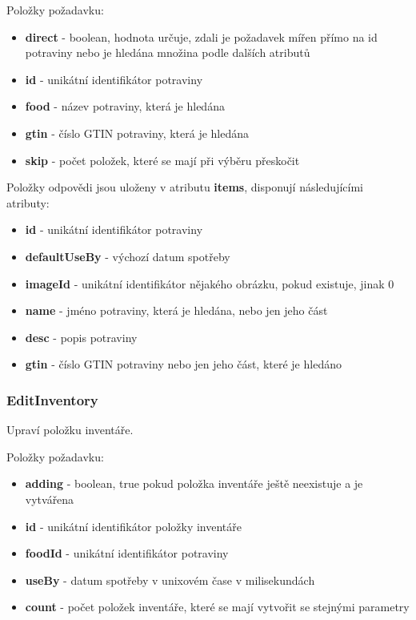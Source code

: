\documentclass[thesis=B,czech]{FITthesis}[2013/10/20]
\begin{document}
Položky požadavku:
\begin{itemize}
  \item \textbf{direct} - boolean, hodnota určuje, zdali je požadavek mířen přímo na id potraviny nebo je hledána množina podle dalších atributů
  \item \textbf{id} - unikátní identifikátor potraviny
  \item \textbf{food} - název potraviny, která je hledána
  \item \textbf{gtin} - číslo GTIN potraviny, která je hledána
  \item \textbf{skip} - počet položek, které se mají při výběru přeskočit
\end{itemize}

Položky odpovědi jsou uloženy v atributu \textbf{items}, disponují následujícími atributy:
\begin{itemize}
  \item \textbf{id} - unikátní identifikátor potraviny
  \item \textbf{defaultUseBy} - výchozí datum spotřeby
  \item \textbf{imageId} - unikátní identifikátor nějakého obrázku, pokud existuje, jinak 0
  \item \textbf{name} - jméno potraviny, která je hledána, nebo jen jeho část
  \item \textbf{desc} - popis potraviny
  \item \textbf{gtin} - číslo GTIN potraviny nebo jen jeho část, které je hledáno
\end{itemize}


\subsubsection{EditInventory}
Upraví položku inventáře.

Položky požadavku:
\begin{itemize}
  \item \textbf{adding} - boolean, true pokud položka inventáře ještě neexistuje a je vytvářena
  \item \textbf{id} - unikátní identifikátor položky inventáře
  \item \textbf{foodId} - unikátní identifikátor potraviny
  \item \textbf{useBy} - datum spotřeby v unixovém čase v milisekundách
  \item \textbf{count} - počet položek inventáře, které se mají vytvořit se stejnými parametry
\end{itemize}
\end{document}
